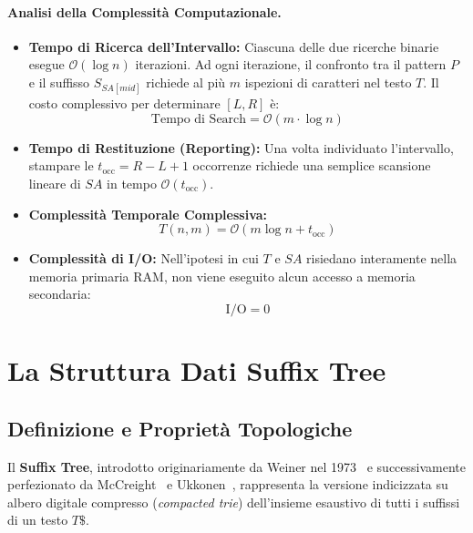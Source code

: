 \paragraph{Analisi della Complessit\`a Computazionale.}
\begin{itemize}
  \item \textbf{Tempo di Ricerca dell'Intervallo:} Ciascuna delle due ricerche binarie esegue $\mathcal{O}(\log n)$ iterazioni. Ad ogni iterazione, il confronto tra il pattern $P$ e il suffisso $S_{SA[mid]}$ richiede al pi\`u $m$ ispezioni di caratteri nel testo $T$. Il costo complessivo per determinare $[L, R]$ \`e:
  \begin{equation}
    \text{Tempo di Search} = \mathcal{O}(m \cdot \log n)
  \end{equation}
  \item \textbf{Tempo di Restituzione (Reporting):} Una volta individuato l'intervallo, stampare le $t_{\text{occ}} = R - L + 1$ occorrenze richiede una semplice scansione lineare di $SA$ in tempo $\mathcal{O}(t_{\text{occ}})$.
  \item \textbf{Complessit\`a Temporale Complessiva:}
  \begin{equation}
    T(n, m) = \mathcal{O}(m \log n + t_{\text{occ}})
  \end{equation}
  \item \textbf{Complessit\`a di I/O:} Nell'ipotesi in cui $T$ e $SA$ risiedano interamente nella memoria primaria RAM, non viene eseguito alcun accesso a memoria secondaria:
  \begin{equation}
    \text{I/O} = 0
  \end{equation}
\end{itemize}

\FloatBarrier
\section{La Struttura Dati Suffix Tree}
\label{sec:suffix-tree}

\FloatBarrier
\subsection{Definizione e Propriet\`a Topologiche}
\label{subsec:definizione-topologia-suffix-tree}

Il \textbf{Suffix Tree}, introdotto originariamente da Weiner nel 1973~\cite{weiner1973} e successivamente perfezionato da McCreight~\cite{mccreight1976} e Ukkonen~\cite{ukkonen1995}, rappresenta la versione indicizzata su albero digitale compresso (\textit{compacted trie}) dell'insieme esaustivo di tutti i suffissi di un testo $T\$$.

